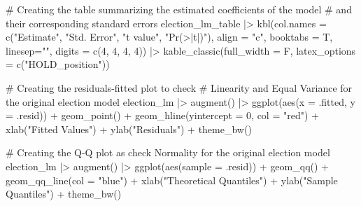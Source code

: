 \documentclass[
  letterpaper,
  DIV=11,
  numbers=noendperiod]{scrartcl}
\newenvironment{Shaded}{\begin{snugshade}}{\end{snugshade}}
\newcommand{\AttributeTok}[1]{\textcolor[rgb]{0.40,0.45,0.13}{#1}}
\newcommand{\CommentTok}[1]{\textcolor[rgb]{0.37,0.37,0.37}{#1}}
\newcommand{\DecValTok}[1]{\textcolor[rgb]{0.68,0.00,0.00}{#1}}
\newcommand{\FunctionTok}[1]{\textcolor[rgb]{0.28,0.35,0.67}{#1}}
\newcommand{\NormalTok}[1]{\textcolor[rgb]{0.00,0.23,0.31}{#1}}
\newcommand{\SpecialCharTok}[1]{\textcolor[rgb]{0.37,0.37,0.37}{#1}}
\newcommand{\StringTok}[1]{\textcolor[rgb]{0.13,0.47,0.30}{#1}}
\begin{document}
\begin{Shaded}
\begin{Highlighting}[]
\CommentTok{\# Creating the table summarizing the estimated coefficients of the model }
\CommentTok{\# and their corresponding standard errors}
\NormalTok{election\_lm\_table }\SpecialCharTok{|\textgreater{}} \FunctionTok{kbl}\NormalTok{(}\AttributeTok{col.names =} \FunctionTok{c}\NormalTok{(}\StringTok{"Estimate"}\NormalTok{, }\StringTok{"Std. Error"}\NormalTok{,}
                                       \StringTok{"t value"}\NormalTok{, }\StringTok{"Pr(\textgreater{}|t|)"}\NormalTok{), }
                         \AttributeTok{align =} \StringTok{"c"}\NormalTok{,}
                         \AttributeTok{booktabs =}\NormalTok{ T,}
                         \AttributeTok{linesep=}\StringTok{""}\NormalTok{,}
                         \AttributeTok{digits =} \FunctionTok{c}\NormalTok{(}\DecValTok{4}\NormalTok{, }\DecValTok{4}\NormalTok{, }\DecValTok{4}\NormalTok{, }\DecValTok{4}\NormalTok{)) }\SpecialCharTok{|\textgreater{}}
  \FunctionTok{kable\_classic}\NormalTok{(}\AttributeTok{full\_width =}\NormalTok{ F, }\AttributeTok{latex\_options =} \FunctionTok{c}\NormalTok{(}\StringTok{"HOLD\_position"}\NormalTok{))}

\CommentTok{\# Creating the residuals{-}fitted plot to check }
\CommentTok{\# Linearity and Equal Variance for the original election model}
\NormalTok{election\_lm }\SpecialCharTok{|\textgreater{}}
  \FunctionTok{augment}\NormalTok{() }\SpecialCharTok{|\textgreater{}}
  \FunctionTok{ggplot}\NormalTok{(}\FunctionTok{aes}\NormalTok{(}\AttributeTok{x =}\NormalTok{ .fitted, }\AttributeTok{y =}\NormalTok{ .resid)) }\SpecialCharTok{+}
  \FunctionTok{geom\_point}\NormalTok{() }\SpecialCharTok{+}
  \FunctionTok{geom\_hline}\NormalTok{(}\AttributeTok{yintercept =} \DecValTok{0}\NormalTok{, }\AttributeTok{col =} \StringTok{"red"}\NormalTok{) }\SpecialCharTok{+}
  \FunctionTok{xlab}\NormalTok{(}\StringTok{"Fitted Values"}\NormalTok{) }\SpecialCharTok{+}
  \FunctionTok{ylab}\NormalTok{(}\StringTok{"Residuals"}\NormalTok{) }\SpecialCharTok{+}
  \FunctionTok{theme\_bw}\NormalTok{()}

\CommentTok{\# Creating the Q{-}Q plot as check Normality for the original election model}
\NormalTok{election\_lm }\SpecialCharTok{|\textgreater{}}
  \FunctionTok{augment}\NormalTok{() }\SpecialCharTok{|\textgreater{}}
  \FunctionTok{ggplot}\NormalTok{(}\FunctionTok{aes}\NormalTok{(}\AttributeTok{sample =}\NormalTok{ .resid)) }\SpecialCharTok{+}
  \FunctionTok{geom\_qq}\NormalTok{() }\SpecialCharTok{+}
  \FunctionTok{geom\_qq\_line}\NormalTok{(}\AttributeTok{col =} \StringTok{"blue"}\NormalTok{) }\SpecialCharTok{+}
  \FunctionTok{xlab}\NormalTok{(}\StringTok{"Theoretical Quantiles"}\NormalTok{) }\SpecialCharTok{+}
  \FunctionTok{ylab}\NormalTok{(}\StringTok{"Sample Quantiles"}\NormalTok{) }\SpecialCharTok{+}
  \FunctionTok{theme\_bw}\NormalTok{()}


\end{Highlighting}
\end{Shaded}
\end{document}
